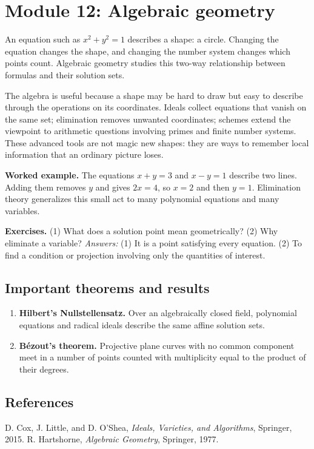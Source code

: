 \documentclass[11pt,oneside]{book}
\makeatletter
\renewenvironment{thebibliography}[1]
  {\list{\@biblabel{\@arabic\c@enumiv}}%
    {\settowidth\labelwidth{\@biblabel{#1}}%
     \leftmargin\labelwidth
     \advance\leftmargin\labelsep
     \usecounter{enumiv}%
     \let\p@enumiv\@empty
     \renewcommand\theenumiv{\@arabic\c@enumiv}}}
  {\endlist}
\makeatother
\begin{document}
\chapter[Module 12: Algebraic geometry]{Module 12: Algebraic geometry}
An equation such as $x^2+y^2=1$ describes a shape: a circle. Changing the equation changes the shape, and changing the number system changes which points count. Algebraic geometry studies this two-way relationship between formulas and their solution sets.

The algebra is useful because a shape may be hard to draw but easy to describe through the operations on its coordinates. Ideals collect equations that vanish on the same set; elimination removes unwanted coordinates; schemes extend the viewpoint to arithmetic questions involving primes and finite number systems. These advanced tools are not magic new shapes: they are ways to remember local information that an ordinary picture loses.

\textbf{Worked example.} The equations $x+y=3$ and $x-y=1$ describe two lines. Adding them removes $y$ and gives $2x=4$, so $x=2$ and then $y=1$. Elimination theory generalizes this small act to many polynomial equations and many variables.

\textbf{Exercises.} (1) What does a solution point mean geometrically? (2) Why eliminate a variable? \emph{Answers:} (1) It is a point satisfying every equation. (2) To find a condition or projection involving only the quantities of interest.

\section*{Important theorems and results}
\begin{enumerate}[leftmargin=*,itemsep=0.35em]
\item \textbf{Hilbert's Nullstellensatz.} Over an algebraically closed field, polynomial equations and radical ideals describe the same affine solution sets.

\item \textbf{B\'ezout's theorem.} Projective plane curves with no common component meet in a number of points counted with multiplicity equal to the product of their degrees.
\end{enumerate}

\section*{References}
\begin{thebibliography}{9}
 D. Cox, J. Little, and D. O'Shea, \emph{Ideals, Varieties, and Algorithms}, Springer, 2015.
 R. Hartshorne, \emph{Algebraic Geometry}, Springer, 1977.
\end{thebibliography}
\end{document}
